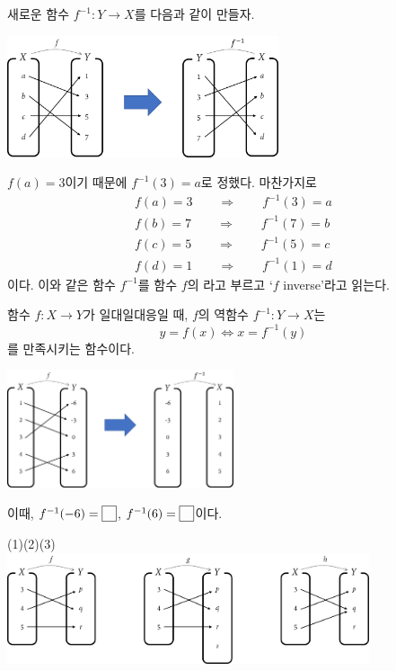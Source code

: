 \documentclass{oblivoir}
\begin{document}
%
\label{inverse1}
새로운 함수 \(f^{-1}:Y\to X\)를 다음과 같이 만들자.
\begin{center}
\includegraphics[width=0.6\textwidth]{inverse_1}
\end{center}
\(f(a)=3\)이기 때문에 \(f^{-1}(3)=a\)로 정했다.
마찬가지로
\begin{align*}
f(a)=3\qquad\Longrightarrow\qquad f^{-1}(3)=a\\
f(b)=7\qquad\Longrightarrow\qquad f^{-1}(7)=b\\
f(c)=5\qquad\Longrightarrow\qquad f^{-1}(5)=c\\
f(d)=1\qquad\Longrightarrow\qquad f^{-1}(1)=d
\end{align*}
이다.
이와 같은 함수 \(f^{-1}\)를 함수 \(f\)의 라고 부르고 `\(f\) inverse'라고 읽는다.
\begin{mdframed}
%
\label{inverse2}
함수 \(f:X\to Y\)가 일대일대응일 때, \(f\)의 역함수 \(f^{-1}:Y\to X\)는
\[y=f(x)\iff x=f^{-1}(y)\]
를 만족시키는 함수이다.
\end{mdframed}

\newpage
%
\label{inverse3}
\begin{center}
\includegraphics[width=0.5\textwidth]{inverse_3}
\end{center}
이때, \(f^{-1}(-6)=\pb{3}\), \(f^{-1}(6)=\pb{4}\)이다.


%
\label{inverse4}
\begin{center}
(1)\hspace{100pt}(2)\hspace{100pt}(3)\\
\includegraphics[width=0.8\textwidth]{inverse_4}
\end{center}
\end{document}

